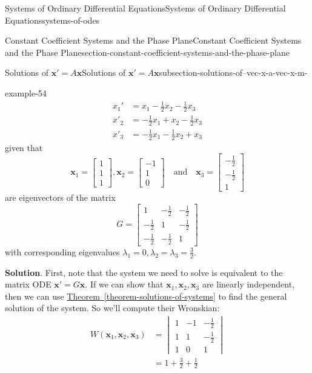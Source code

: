 \documentclass[oneside,10pt,]{book}
\numberwithin{equation}{section}
\renewcommand{\vec}[1]{\mathbf{#1}}
\newcommand{\amp}{&}
\begin{document}
\begin{chapterptx}{Systems of Ordinary Differential Equations}{}{Systems of Ordinary Differential Equations}{}{}{systems-of-odes}
\begin{sectionptx}{Constant Coefficient Systems and the Phase Plane}{}{Constant Coefficient Systems and the Phase Plane}{}{}{section-constant-coefficient-systems-and-the-phase-plane}
\begin{subsectionptx}{Solutions of \(\vec{x}' = A\vec{x}\)}{}{Solutions of \(\vec{x}' = A\vec{x}\)}{}{}{subsection-solutions-of--vec-x-a-vec-x-m-}
\begin{example}{}{example-54}
\begin{align*}
x_{1}'  \amp = x_{1}-\frac{1}{2}x_{2}-\frac{1}{2}x_{3}\\
x'_{2}  \amp =  -\frac{1}{2}x_{1}+x_{2}-\frac{1}{2}x_{3}\\
x'_{3}  \amp =  -\frac{1}{2}x_{1}-\frac{1}{2}x_{2}+x_{3}
\end{align*}
given that%
\begin{equation*}
\vec{x}_{1} = \begin{bmatrix}1\\1\\1\end{bmatrix},\vec{x}_{2} = \begin{bmatrix}-1\\1\\0\end{bmatrix}\quad\text{and}\quad\vec{x}_{3} = \begin{bmatrix}-\frac{1}{2}\\-\frac{1}{2}\\1\end{bmatrix}
\end{equation*}
are eigenvectors of the matrix%
\begin{equation*}
G = \begin{bmatrix}1 \amp  -\frac{1}{2}  \amp  -\frac{1}{2}\\-\frac{1}{2}  \amp  1 \amp  -\frac{1}{2} \\ -\frac{1}{2}  \amp  -\frac{1}{2}  \amp    1\end{bmatrix}
\end{equation*}
with corresponding eigenvalues \(\lambda_{1} = 0,\lambda_{2} = \lambda_{3} = \frac{3}{2}\).%
\par\smallskip%
\noindent\textbf{Solution}.\hypertarget{solution-51}{}\quad%
\hypertarget{p-328}{}%
First, note that the system we need to solve is equivalent to the matrix ODE \(\vec{x}' = G\vec{x}\). If we can show that \(\vec{x}_{1},\vec{x}_{2},\vec{x}_{3}\) are linearly independent, then we can use \hyperref[theorem-solutions-of-systems]{Theorem~\ref{theorem-solutions-of-systems}} to find the general solution of the system. So we'll compute their Wronskian:%
\begin{align*}
W(\vec{x}_{1},\vec{x}_{2},\vec{x}_{3}) \amp = \begin{vmatrix} 1  \amp  -1  \amp  -\frac{1}{2} \\ 1 \amp  1 \amp  -\frac{1}{2} \\ 1 \amp  0 \amp  1\end{vmatrix}\\
\amp = 1+\frac{3}{2}+\frac{1}{2}\\

\end{align*}
\end{example}
\end{subsectionptx}
\end{sectionptx}
\end{chapterptx}
\end{document}
